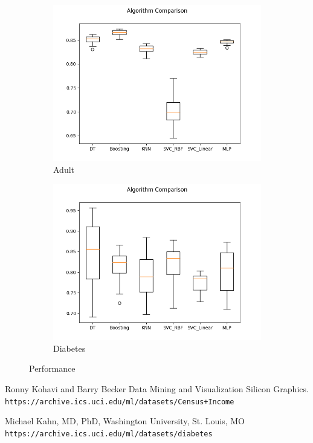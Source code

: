 \documentclass[11pt, twocolumn]{article}
\begin{document}
    \begin{figure}[!htbp]
        \begin{subfigure}{.24\textwidth}
            \centering
            \includegraphics[width=.9\textwidth]{Adult_optimized}
            \caption{Adult}
            \label{fig:comparisons_Adult}
        \end{subfigure}
        \begin{subfigure}{.24\textwidth}
            \centering
            \includegraphics[width=.9\textwidth]{Diabetes_optimized}
            \caption{Diabetes}
            \label{fig:comparisons_Diabetes}
        \end{subfigure}
        \caption{Performance}
    \end{figure}
    \FloatBarrier

    \newpage
    \begin{thebibliography}{9}
        Ronny Kohavi and Barry Becker
        Data Mining and Visualization
        Silicon Graphics.
        \\\texttt{https://archive.ics.uci.edu/ml/datasets/Census+Income}

        Michael Kahn, MD, PhD, Washington University, St. Louis, MO
        \\\texttt{https://archive.ics.uci.edu/ml/datasets/diabetes}

    \end{thebibliography}
\end{document}
